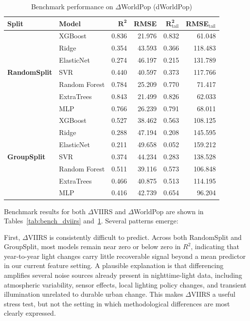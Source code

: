\documentclass[pdflatex,sn-basic,Numbered]{sn-jnl}
\renewcommand{\arraystretch}{1.1}
\begin{document}
\begin{table}[htbp]
\centering
\scriptsize
\setlength{\tabcolsep}{3pt}
\renewcommand{\arraystretch}{1.05}
\caption{Benchmark performance on $\Delta$WorldPop (dWorldPop)}
\label{tab:bench_dworldpop}
\begin{tabular}{llrrrr}
\toprule
\textbf{Split} & \textbf{Model} & $\mathbf{R^2}$ & \textbf{RMSE} & $\mathbf{R^2_{\mathrm{tail}}}$ & \textbf{RMSE}$_{\mathrm{tail}}$ \\
\midrule
\multirow{7}{*}{\textbf{RandomSplit}} & XGBoost     & 0.836 & 21.976 & 0.832 &  61.048 \\
                            & Ridge       & 0.354 & 43.593 & 0.366 & 118.483 \\
                            & ElasticNet  & 0.274 & 46.197 & 0.215 & 131.789 \\
                            & SVR         & 0.440 & 40.597 & 0.373 & 117.766 \\
                            & Random Forest & 0.784 & 25.209 & 0.770 &  71.417 \\
                            & ExtraTrees  & 0.843 & 21.499 & 0.826 &  62.033 \\
                            & MLP         & 0.766 & 26.239 & 0.791 &  68.011 \\
\midrule
\multirow{7}{*}{\textbf{GroupSplit}} & XGBoost     & 0.527 & 38.462 & 0.563 & 108.125 \\
                            & Ridge       & 0.288 & 47.194 & 0.208 & 145.595 \\
                            & ElasticNet  & 0.211 & 49.658 & 0.052 & 159.212 \\
                            & SVR         & 0.374 & 44.234 & 0.283 & 138.528 \\
                            & Random Forest & 0.511 & 39.116 & 0.573 & 106.848 \\
                            & ExtraTrees  & 0.466 & 40.875 & 0.513 & 114.195 \\
                            & MLP         & 0.416 & 42.739 & 0.654 &  96.204 \\
\bottomrule
\end{tabular}
\end{table}

Benchmark results for both $\Delta$VIIRS and $\Delta$WorldPop are shown in Tables~\ref{tab:bench_dviirs} and~\ref{tab:bench_dworldpop}. Several patterns emerge:

First, $\Delta$VIIRS is consistently difficult to predict. Across both RandomSplit and GroupSplit, most models remain near zero or below zero in $R^2$, indicating that year-to-year light changes carry little recoverable signal beyond a mean predictor in our current feature setting. A plausible explanation is that differencing amplifies several noise sources already present in nighttime-light data, including atmospheric variability, sensor effects, local lighting policy changes, and transient illumination unrelated to durable urban change. This makes $\Delta$VIIRS a useful stress test, but not the setting in which methodological differences are most clearly expressed.
\end{document}
